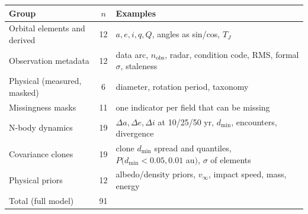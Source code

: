 \begin{tabular}{>{\raggedright\arraybackslash}p{}c>{\raggedright\arraybackslash}p{}}
\toprule
Group & $n$ & Examples\\
\midrule
Orbital elements and derived & 12 & $a, e, i, q, Q$, angles as sin/cos, $T_J$\\
Observation metadata & 12 & data arc, $n_{\mathrm{obs}}$, radar, condition code, RMS, formal $\sigma$, staleness\\
Physical (measured, masked) & 6 & diameter, rotation period, taxonomy\\
Missingness masks & 11 & one indicator per field that can be missing\\
N-body dynamics & 19 & $\Delta a,\Delta e,\Delta i$ at 10/25/50 yr, $d_{\min}$, encounters, divergence\\
Covariance clones & 19 & clone $d_{\min}$ spread and quantiles, $P(d_{\min}<0.05,0.01$ au$)$, $\sigma$ of elements\\
Physical priors & 12 & albedo/density priors, $v_\infty$, impact speed, mass, energy\\
\midrule
Total (full model) & 91 & \\
\bottomrule
\end{tabular}
